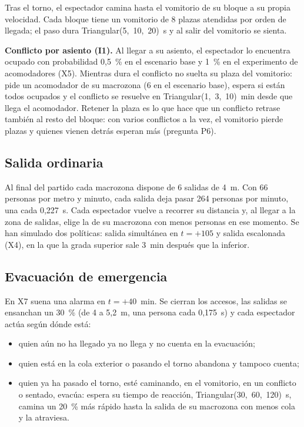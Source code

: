 Tras el torno, el espectador camina hasta el vomitorio de su bloque a su propia
velocidad. Cada bloque tiene un vomitorio de 8 plazas atendidas por orden de
llegada; el paso dura Triangular(5,~10,~20)~s y al salir del vomitorio se sienta.

\textbf{Conflicto por asiento (I1).} Al llegar a su asiento, el espectador lo
encuentra ocupado con probabilidad 0,5~\% en el escenario base y 1~\% en el
experimento de acomodadores (X5). Mientras dura el conflicto no suelta su plaza
del vomitorio: pide un acomodador de su macrozona (6 en el escenario base),
espera si están todos ocupados y el conflicto se resuelve en Triangular(1,~3,~10)~min
desde que llega el acomodador. Retener la plaza es lo que hace que un conflicto
retrase también al resto del bloque: con varios conflictos a la vez, el
vomitorio pierde plazas y quienes vienen detrás esperan más (pregunta P6).

\subsection{Salida ordinaria}

Al final del partido cada macrozona dispone de 6 salidas de 4~m. Con 66 personas
por metro y minuto, cada salida deja pasar 264 personas por minuto, una cada
0,227~s. Cada espectador vuelve a recorrer su distancia y, al llegar a la zona de
salidas, elige la de su macrozona con menos personas en ese momento. Se han
simulado dos políticas: salida simultánea en $t=+105$ y salida escalonada (X4),
en la que la grada superior sale 3~min después que la inferior.

\subsection{Evacuación de emergencia}

En X7 suena una alarma en $t=+40$~min. Se cierran los accesos, las salidas se
ensanchan un 30~\% (de 4 a 5,2~m, una persona cada 0,175~s) y cada espectador
actúa según dónde está:

\begin{itemize}
  \item quien aún no ha llegado ya no llega y no cuenta en la evacuación;
  \item quien está en la cola exterior o pasando el torno abandona y tampoco cuenta;
  \item quien ya ha pasado el torno, esté caminando, en el vomitorio, en un
    conflicto o sentado, evacúa: espera su tiempo de reacción,
    Triangular(30,~60,~120)~s, camina un 20~\% más rápido hasta la salida de su
    macrozona con menos cola y la atraviesa.
\end{itemize}

